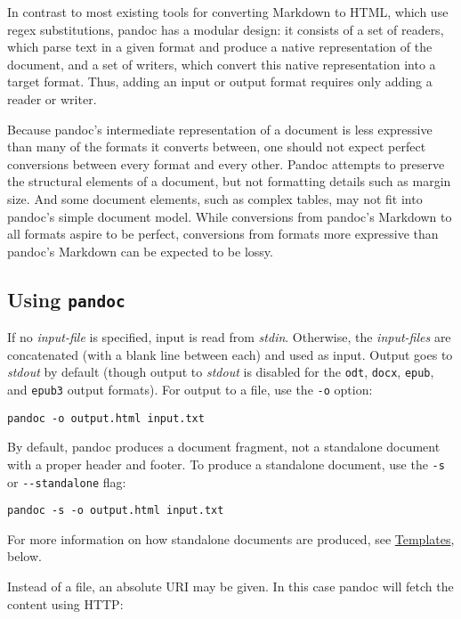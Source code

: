 \documentclass[]{article}
\begin{document}
In contrast to most existing tools for converting Markdown to HTML,
which use regex substitutions, pandoc has a modular design: it consists
of a set of readers, which parse text in a given format and produce a
native representation of the document, and a set of writers, which
convert this native representation into a target format. Thus, adding an
input or output format requires only adding a reader or writer.

Because pandoc's intermediate representation of a document is less
expressive than many of the formats it converts between, one should not
expect perfect conversions between every format and every other. Pandoc
attempts to preserve the structural elements of a document, but not
formatting details such as margin size. And some document elements, such
as complex tables, may not fit into pandoc's simple document model.
While conversions from pandoc's Markdown to all formats aspire to be
perfect, conversions from formats more expressive than pandoc's Markdown
can be expected to be lossy.

\subsection{\texorpdfstring{Using
\texttt{pandoc}}{Using pandoc}}\label{using-pandoc}

If no \emph{input-file} is specified, input is read from \emph{stdin}.
Otherwise, the \emph{input-files} are concatenated (with a blank line
between each) and used as input. Output goes to \emph{stdout} by default
(though output to \emph{stdout} is disabled for the \texttt{odt},
\texttt{docx}, \texttt{epub}, and \texttt{epub3} output formats). For
output to a file, use the \texttt{-o} option:

\begin{verbatim}
pandoc -o output.html input.txt
\end{verbatim}

By default, pandoc produces a document fragment, not a standalone
document with a proper header and footer. To produce a standalone
document, use the \texttt{-s} or \texttt{-\/-standalone} flag:

\begin{verbatim}
pandoc -s -o output.html input.txt
\end{verbatim}

For more information on how standalone documents are produced, see
\protect\hyperlink{templates}{Templates}, below.

Instead of a file, an absolute URI may be given. In this case pandoc
will fetch the content using HTTP:
\end{document}
